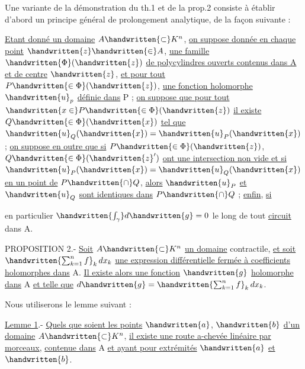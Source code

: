 Une variante de la démonstration du th.1 et de la prop.2 consiste à établir d'abord un principe général de prolongement analytique, de la façon suivante :

\uline{Etant donné un domaine} $A\handwritten{\subset}K^n$, \uline{on suppose donnée en chaque point} $\handwritten{z}\handwritten{\in}A$, \uline{une famille} $\handwritten{\Phi}(\handwritten{z})$ \uline{de polycylindres ouverts contenus dans A et de centre} $\handwritten{z}$, \uline{et pour tout} $P\handwritten{\in\Phi}(\handwritten{z})$, \uline{une fonction holomorphe} $\handwritten{u}_{p}$ \uline{définie dans} P ; \uline{on suppose que pour tout} $\handwritten{x\in}P\handwritten{\in\Phi}(\handwritten{z})$ \uline{il existe} $Q\handwritten{\in\Phi}(\handwritten{x})$ \uline{tel que} $\handwritten{u}_Q(\handwritten{x})=\handwritten{u}_P(\handwritten{x})$ ; \uline{on suppose en outre que si} $P\handwritten{\in\Phi}(\handwritten{z})$, $Q\handwritten{\in\Phi}(\handwritten{z}')$ \uline{ont une intersection non vide et si} $\handwritten{u}_P(\handwritten{x})=\handwritten{u}_Q(\handwritten{x})$ \uline{en un point de} $P\handwritten{\cap}Q$, \uline{alors} $\handwritten{u}_P$ \uline{et} $\handwritten{u}_Q$ \uline{sont identiques dans} $P\handwritten{\cap}Q$ ; \uline{enfin}, \uline{si}



en particulier $\handwritten{\int_\gamma}d\handwritten{g}=0$ le long de tout \uline{circuit} dans A.

PROPOSITION 2.- \uline{Soit} $A\handwritten{\subset}K^n$ \uline{un domaine} contractile, \uline{et soit} $\handwritten{\sum_{k=1}^n f}_k\,dx_k$ \uline{une expression différentielle fermée à coefficients holomorphes dans} A. \uline{Il existe alors une fonction} $\handwritten{g}$ \uline{holomorphe dans} A \uline{et telle que} $d\handwritten{g}=\handwritten{\sum_{k=1}^n f}_k\,dx_k$.

Nous utiliserons le lemme suivant :

\uline{Lemme 1}.- \uline{Quels que soient les points} $\handwritten{a}$, $\handwritten{b}$ \uline{d'un domaine} $A\handwritten{\subset}K^n$, \uline{il existe une route a-chevée linéaire par morceaux}, \uline{contenue dans} A \uline{et ayant pour extrémités} $\handwritten{a}$ \uline{et} $\handwritten{b}$.

